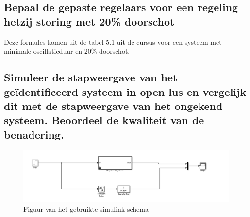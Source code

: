 \documentclass[a4paper, 12pt]{article}
\begin{document}
\newpage

\subsection{Bepaal de gepaste regelaars voor een regeling hetzij storing met 20\% doorschot}

\begin{table}[!h]
\begin{large}
\centering
{}
\end{large}
\end{table}
Deze formules komen uit de tabel 5.1 uit de cursus voor een systeem met minimale oscillatieduur en 20\% doorschot.

\subsection{Simuleer de stapweergave van het geïdentificeerd systeem in open lus en vergelijk dit met de stapweergave van het ongekend systeem. Beoordeel de kwaliteit van de benadering.}

\begin{figure}[!h]
	\includegraphics[width=1\linewidth]{Labo1_3_systeem.jpg}
	\caption{Figuur van het gebruikte simulink schema}
\end{figure}
\end{document}
